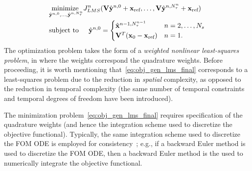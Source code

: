 \begin{equation}\label{eq:obj_gen_lms_final}
\begin{split}
& \underset{\hat{\mathbf{y}}^{n,0},\ldots,\hat{\mathbf{y}}^{n,N_{\tau}^{n}}}{\text{minimize } }
J_{LMS}^{n} (\mathbf {V} \hat{\mathbf{y}}^{n,0} + \mathbf{x}_\text{ref},\ldots,\mathbf {V} \hat{\mathbf{y}}^{n,N_{\tau}^{n}} + \mathbf{x}_\text{ref}) \\ 
& \text{subject to} \hspace{0.2 in}
\hat{\mathbf{y}}^{n,0} =
\begin{cases} \hat{\mathbf{x}}^{n-1, N_{\tau}^{n-1}} & n = 2,\ldots,N_s \\
\mathbf {V}^T({{\mathbf{x}}_0} - \mathbf{x}_\text{ref})& n=1. \end{cases} 
\end{split}
\end{equation}
The optimization problem takes the form of a \textit{weighted nonlinear least-squares problem}, 
in where the weights correspond the quadrature weights.  
Before proceeding, it is worth mentioning that~\eqref{eq:obj_gen_lms_final} corresponds to a least-squares problem due
to the reduction in \textit{spatial} complexity, as opposed to the reduction
in temporal complexity (the same  number of temporal constraints and temporal 
degrees of freedom have been introduced).
 
The minimization problem~\eqref{eq:obj_gen_lms_final} requires specification of the quadrature weights (and hence the integration scheme used to discretize 
the objective functional). Typically, the same integration scheme used to discretize the FOM ODE is employed for consistency~\cite{colloc_review}; e.g., if a  
backward Euler method is used to discretize the FOM ODE, then a backward Euler method is the used to numerically integrate the objective functional.

